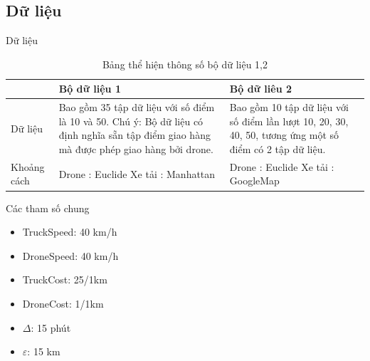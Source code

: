 \documentclass[compress]{beamer}
\begin{document}
\subsection{Dữ liệu}
\begin{frame}{Dữ liệu}
\footnotesize
\begin{longtable}{|l|p{4.25cm}|p{4.25cm}|}
\caption{Bảng thể hiện thông số bộ dữ liệu 1,2}
\label{data}\\
\toprule
&Bộ dữ liệu 1 & Bộ dữ liêu 2\\
\midrule
\toprule
Dữ liệu &Bao gồm 35 tập dữ liệu với số điểm là 10 và 50. \newline Chú ý: Bộ dữ liệu có định nghĩa sẵn tập điểm giao hàng mà được phép giao hàng bởi drone. &Bao gồm 10 tập dữ liệu với số điểm lần lượt 10, 20, 30, 40, 50, tương ứng một số điểm có 2 tập dữ liệu. \\
\hline
Khoảng cách & Drone : Euclide \newline Xe tải : Manhattan & Drone : Euclide \newline Xe tải : GoogleMap\\
\hline
\end{longtable}
\normalsize
\begin{block}{Các tham số chung}
\begin{multicols}{2}
\begin{itemize}
\item TruckSpeed: 40 km/h
\item DroneSpeed: 40 km/h
\item TruckCost: 25/1km
\item DroneCost: 1/1km
\item $\Delta$: 15 phút
\item $\varepsilon$: 15 km
\end{itemize}
\end{multicols}

\end{block}

\end{frame}
%
%
\end{document}
